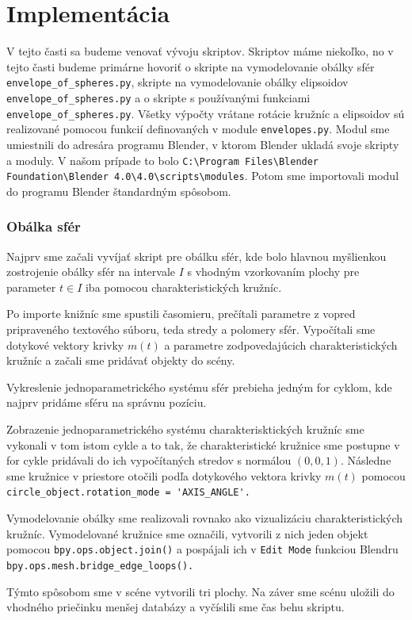 \section{Implementácia}
V tejto časti sa budeme venovať vývoju skriptov. Skriptov máme niekoľko, no v tejto časti budeme primárne hovoriť o skripte na vymodelovanie obálky sfér \verb|envelope_of_spheres.py|, skripte na vymodelovanie obálky elipsoidov \verb|envelope_of_spheres.py| a o skripte s používanými funkciami \verb|envelope_of_spheres.py|. Všetky výpočty vrátane rotácie kružníc a elipsoidov sú realizované pomocou funkcií definovaných v module \verb|envelopes.py|. Modul sme umiestnili do adresára programu Blender, v ktorom Blender ukladá svoje skripty a moduly. V našom prípade to bolo \verb|C:\Program Files\Blender Foundation\Blender 4.0\4.0\scripts\modules|. Potom sme importovali modul do programu Blender štandardným spôsobom. 
\subsubsection*{Obálka sfér}
Najprv sme začali vyvíjať skript pre obálku sfér, kde bolo hlavnou myšlienkou zostrojenie obálky sfér na intervale $I$ s vhodným vzorkovaním plochy pre parameter $t \in I$ iba pomocou charakteristických kružníc. 

Po importe knižníc sme spustili časomieru, prečítali parametre z vopred pripraveného textového súboru, teda stredy a polomery sfér. Vypočítali sme dotykové vektory krivky $m(t)$ a parametre zodpovedajúcich charakteristických kružníc a začali sme pridávať objekty do scény. 

Vykreslenie jednoparametrického systému sfér prebieha jedným for cyklom, kde najprv pridáme sféru na správnu pozíciu.

Zobrazenie jednoparametrického systému charakterisktických kružníc sme vykonali v tom istom cykle a to tak, že charakteristické kružnice sme postupne v for cykle pridávali do ich vypočítaných stredov s normálou $(0,0,1). $ Následne sme kružnice v priestore otočili podľa dotykového vektora krivky $m(t)$ pomocou \verb|circle_object.rotation_mode = 'AXIS_ANGLE'.|

Vymodelovanie obálky sme realizovali rovnako ako vizualizáciu charakteristických kružníc. Vymodelované kružnice sme označili, vytvorili z nich jeden objekt pomocou \verb|bpy.ops.object.join()| a pospájali ich v \verb|Edit Mode| funkciou Blendru \verb|bpy.ops.mesh.bridge_edge_loops().| 


Týmto spôsobom sme v scéne vytvorili tri plochy. Na záver sme scénu uložili do vhodného priečinku menšej databázy a vyčíslili sme čas behu skriptu.

